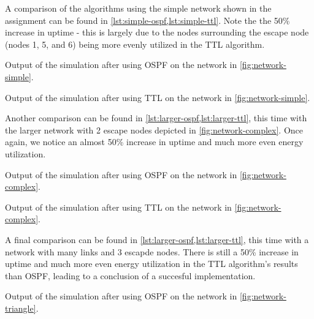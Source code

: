 \documentclass[headings=optiontoheadandtoc,listof=totoc,parskip=full]{scrartcl}
\begin{document}
A comparison of the algorithms using the simple network shown in the assignment can be found in \cref{lst:simple-ospf,lst:simple-ttl}. Note the the 50\% increase in uptime - this is largely due to the nodes surrounding the escape node (nodes 1, 5, and 6) being more evenly utilized in the TTL algorithm.

\begin{listing}[H]
    \caption{Output of the simulation after using OSPF on the network in \cref{fig:network-simple}.}
    \label{lst:simple-ospf}
\end{listing}

\begin{listing}[H]
    \caption{Output of the simulation after using TTL on the network in \cref{fig:network-simple}.}
    \label{lst:simple-ttl}
\end{listing}

Another comparison can be found in \cref{lst:larger-ospf,lst:larger-ttl}, this time with the larger network with 2 escape nodes depicted in \cref{fig:network-complex}. Once again, we notice an almost 50\% increase in uptime and much more even energy utilization.

\begin{listing}[H]
    \caption{Output of the simulation after using OSPF on the network in \cref{fig:network-complex}.}
    \label{lst:larger-ospf}
\end{listing}

\begin{listing}[H]
    \caption{Output of the simulation after using TTL on the network in \cref{fig:network-complex}.}
    \label{lst:larger-ttl}
\end{listing}

A final comparison can be found in \cref{lst:larger-ospf,lst:larger-ttl}, this time with a network with many links and 3 escapde nodes. There is still a 50\% increase in uptime and much more even energy utilization in the TTL algorithm's results than OSPF, leading to a conclusion of a succesful implementation.

\begin{listing}[H]
    \caption{Output of the simulation after using OSPF on the network in \cref{fig:network-triangle}.}
    \label{lst:pyramid-ospf}
\end{listing}
\end{document}
